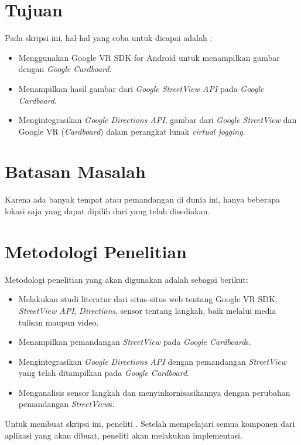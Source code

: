 
\section{Tujuan}
\label{sec:tujuan}
Pada skripsi ini, hal-hal yang coba untuk dicapai adalah :
\begin{itemize}
	\item Menggunakan Google VR SDK for Android untuk menampilkan gambar dengan {\it Google Cardboard}.
	\item Menampilkan hasil gambar dari \textit{Google StreetView API} pada {\it Google Cardboard}.
	\item Mengintegrasikan \textit{Google Directions API}, gambar dari \textit{Google StreetView} dan Google VR (\textit{Cardboard}) dalam perangkat lunak {\it virtual jogging}.
\end{itemize}


\section{Batasan Masalah}
\label{sec:batasan}
Karena ada banyak tempat atau pemandangan di dunia ini, hanya beberapa lokasi saja yang dapat dipilih dari yang telah disediakan.


\section{Metodologi Penelitian}
\label{sec:metlit}
Metodologi penelitian yang akan digunakan adalah sebagai berikut:
\begin{itemize}
	\item Melakukan studi literatur dari situs-situs web tentang Google VR SDK, \textit{StreetView API}, \textit{Directions}, sensor tentang langkah, baik melalui media tulisan maupun video.
	\item Menampilkan pemandangan {\it StreetView} pada {\it Google Cardboard}s.
	\item Mengintegrasikan {\it Google Directions API} dengan pemandangan {\it StreetView} yang telah ditampilkan pada {\it Google Cardboard}.
	\item Menganalisis sensor langkah dan menyinkornisasikannya dengan perubahan pemandangan \textit{StreetView}s.
\end{itemize}
Untuk membuat skripsi ini, peneliti . Setelah mempelajari semua komponen dari aplikasi yang akan dibuat, peneliti akan melakukan implementasi. 

